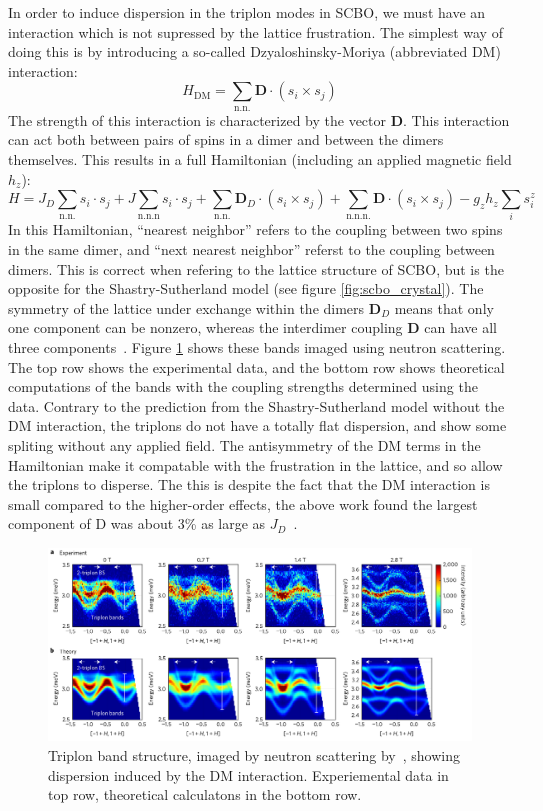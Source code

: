 \documentclass{thesis-umich}
\begin{document}
In order to induce dispersion in the triplon modes in SCBO, we must have an interaction which is not supressed by the lattice frustration. The simplest way of doing this is by introducing a so-called Dzyaloshinsky-Moriya (abbreviated DM) interaction:
\[ H_{\mathrm{DM}} = \sum_{\mathrm{n.n.}} \mathbf{D} \cdot (s_i \times s_j) \]
The strength of this interaction is characterized by the vector $\mathbf{D}$. This interaction can act both between pairs of spins in a dimer and between the dimers themselves. This results in a full Hamiltonian (including an applied magnetic field $h_z$):
\[ H = J_D \sum_{\mathrm{n.n.}} s_i \cdot s_j + J \sum_{\mathrm{n.n.n}} s_i \cdot s_j + \sum_{\mathrm{n.n.}} \mathbf{D}_D \cdot (s_i \times s_j) + \sum_{\mathrm{n.n.n.}} \mathbf{D} \cdot (s_i \times s_j) - g_z h_z \sum_i s_i^z\]
In this Hamiltonian, ``nearest neighbor'' refers to the coupling between two spins in the same dimer, and ``next nearest neighbor'' referst to the coupling between dimers. This is correct when refering to the lattice structure of SCBO, but is the opposite for the Shastry-Sutherland model (see figure \ref{fig:scbo_crystal}). The symmetry of the lattice under exchange within the dimers $\mathbf{D}_D$ means that only one component can be nonzero, whereas the interdimer coupling $\mathbf{D}$ can have all three components~\cite{McClarty2017}. Figure \ref{fig:scbo_triplon_bands} shows these bands imaged using neutron scattering. The top row shows the experimental data, and the bottom row shows theoretical computations of the bands with the coupling strengths determined using the data. Contrary to the prediction from the Shastry-Sutherland model without the DM interaction, the triplons do not have a totally flat dispersion, and show some spliting without any applied field. The antisymmetry of the DM terms in the Hamiltonian make it compatable with the frustration in the lattice, and so allow the triplons to disperse. The this is despite the fact that the DM interaction is small compared to the higher-order effects, the above work found the largest component of $\mathrm{D}$ was about 3\% as large as $J_D$~\cite{McClarty2017}.
\begin{figure}
	\centering
	\caption[Triplon Bands in SCBO]{Triplon band structure, imaged by neutron scattering by~\cite{McClarty2017}, showing dispersion induced by the DM interaction. Experiemental data in top row, theoretical calculatons in the bottom row.}
	\label{fig:scbo_triplon_bands}
	\includegraphics[width=\columnwidth]{figures/SCBO_triplon_bands_McClarty.pdf}
\end{figure}
\end{document}
